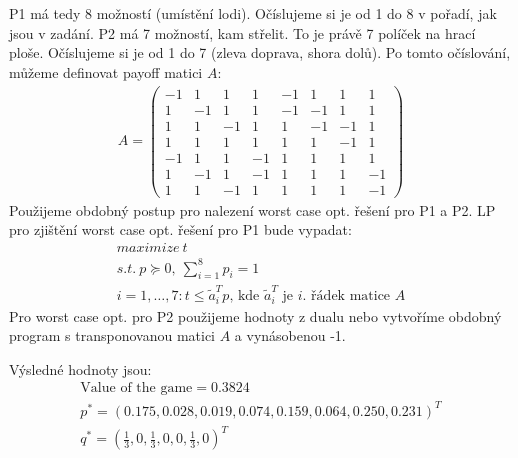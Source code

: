 \documentclass[10pt, a4paper]{article}
\begin{document}
\section{}
P1 má tedy 8 možností (umístění lodi). Očíslujeme si je od 1 do 8 v pořadí, jak jsou v zadání. P2 má 7 možností, kam střelit. To je právě 7 políček na hrací ploše. Očíslujeme si je od 1 do 7 (zleva doprava, shora dolů). Po tomto očíslování, můžeme definovat payoff matici $A$:
\begin{gather*}
A = \begin{pmatrix}
-1 & 1 & 1 & 1 & -1 & 1 & 1 & 1\\
1 & -1 & 1 & 1 & -1 & -1 & 1 & 1\\
1 & 1 & -1 & 1 & 1 & -1 & -1 & 1\\
1 & 1 & 1 & 1 & 1 & 1 & -1 & 1\\
-1 & 1 & 1 & -1 & 1 & 1 & 1 & 1\\
1 & -1 & 1 & -1 & 1 & 1 & 1 & -1\\
1 & 1 & -1 & 1 & 1 & 1 & 1 & -1
\end{pmatrix}
\end{gather*}
Použijeme obdobný postup pro nalezení worst case opt. řešení pro P1 a P2. LP pro zjištění worst case opt. řešení pro P1 bude vypadat:
\begin{gather*}
maximize \ t\\
s.t. \ p \succeq 0, \ \sum_{i=1}^8 p_i = 1\\
i=1,\dots, 7: t \leq \tilde{a}_i^T p \text{, kde }\tilde{a}_i^T \text{ je }i. \text{ řádek matice } A
\end{gather*}
Pro worst case opt. pro P2 použijeme hodnoty z dualu nebo vytvoříme obdobný program s transponovanou matici $A$ a vynásobenou -1.


Výsledné hodnoty jsou:
\begin{gather*}
\text{Value of the game} = 0.3824\\
p^* = (0.175, 0.028, 0.019, 0.074, 0.159, 0.064, 0.250, 0.231)^T\\
q^* = (\frac{1}{3}, 0, \frac{1}{3}, 0, 0, \frac{1}{3}, 0)^T\\
\end{gather*}

\section{}
\end{document}
